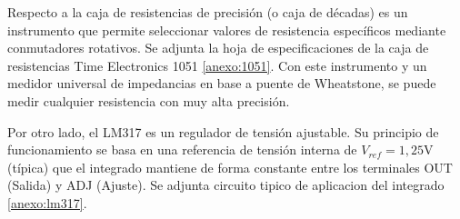Respecto a la caja de resistencias de precisión (o caja de décadas) es un instrumento que permite seleccionar valores de 
resistencia específicos mediante conmutadores rotativos. Se adjunta la hoja de especificaciones de la caja de
resistencias Time Electronics 1051 \ref{anexo:1051}. Con este instrumento y un medidor universal de impedancias en base
a puente de Wheatstone, se puede medir cualquier resistencia con muy alta precisión.

Por otro lado, el LM317 es un regulador de tensión ajustable. Su principio de
funcionamiento se basa en una referencia de tensión interna de $V_{ref} = 1,25\text{V}$ (típica) que el integrado 
mantiene de forma constante entre los terminales OUT (Salida) y ADJ (Ajuste). Se adjunta circuito tipico de aplicacion
del integrado \ref{anexo:lm317}.
